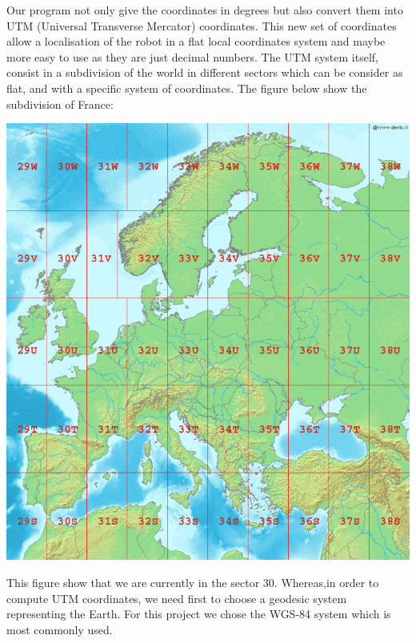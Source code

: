Our program not only give the coordinates in degrees but also convert them into UTM (Universal Transverse Mercator) coordinates. This new set of coordinates allow a localisation of the robot in a flat local coordinates system and maybe more easy to use as they are just decimal numbers. The UTM system itself, consist in a subdivision of the world in different sectors which can be consider as flat, and with a specific system of coordinates.
The figure below show the subdivision of France: \

\begin{center}
\includegraphics[scale=0.2]{secteurUTM.png} 
\label{fig1}
\end{center}

This figure show that we are currently in the sector 30. Whereas,in order to compute UTM coordinates, we need first to choose a geodesic system representing the Earth. For this project we chose the WGS-84 system which is most commonly used.



